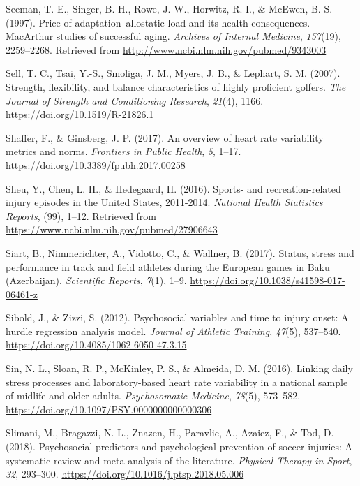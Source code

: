 \documentclass[man,floatsintext]{apa6}
\begin{document}
\leavevmode\hypertarget{ref-Seeman1997}{}%
Seeman, T. E., Singer, B. H., Rowe, J. W., Horwitz, R. I., \& McEwen, B. S. (1997). Price of adaptation--allostatic load and its health consequences. MacArthur studies of successful aging. \emph{Archives of Internal Medicine}, \emph{157}(19), 2259--2268. Retrieved from \url{http://www.ncbi.nlm.nih.gov/pubmed/9343003}

\leavevmode\hypertarget{ref-Sell2007}{}%
Sell, T. C., Tsai, Y.-S., Smoliga, J. M., Myers, J. B., \& Lephart, S. M. (2007). Strength, flexibility, and balance characteristics of highly proficient golfers. \emph{The Journal of Strength and Conditioning Research}, \emph{21}(4), 1166. \url{https://doi.org/10.1519/R-21826.1}

\leavevmode\hypertarget{ref-Shaffer2017}{}%
Shaffer, F., \& Ginsberg, J. P. (2017). An overview of heart rate variability metrics and norms. \emph{Frontiers in Public Health}, \emph{5}, 1--17. \url{https://doi.org/10.3389/fpubh.2017.00258}

\leavevmode\hypertarget{ref-Sheu2016}{}%
Sheu, Y., Chen, L. H., \& Hedegaard, H. (2016). Sports- and recreation-related injury episodes in the United States, 2011-2014. \emph{National Health Statistics Reports}, (99), 1--12. Retrieved from \url{https://www.ncbi.nlm.nih.gov/pubmed/27906643}

\leavevmode\hypertarget{ref-Siart2017}{}%
Siart, B., Nimmerichter, A., Vidotto, C., \& Wallner, B. (2017). Status, stress and performance in track and field athletes during the European games in Baku (Azerbaijan). \emph{Scientific Reports}, \emph{7}(1), 1--9. \url{https://doi.org/10.1038/s41598-017-06461-z}

\leavevmode\hypertarget{ref-Sibold2012}{}%
Sibold, J., \& Zizzi, S. (2012). Psychosocial variables and time to injury onset: A hurdle regression analysis model. \emph{Journal of Athletic Training}, \emph{47}(5), 537--540. \url{https://doi.org/10.4085/1062-6050-47.3.15}

\leavevmode\hypertarget{ref-Sin2016}{}%
Sin, N. L., Sloan, R. P., McKinley, P. S., \& Almeida, D. M. (2016). Linking daily stress processes and laboratory-based heart rate variability in a national sample of midlife and older adults. \emph{Psychosomatic Medicine}, \emph{78}(5), 573--582. \url{https://doi.org/10.1097/PSY.0000000000000306}

\leavevmode\hypertarget{ref-Slimani2018}{}%
Slimani, M., Bragazzi, N. L., Znazen, H., Paravlic, A., Azaiez, F., \& Tod, D. (2018). Psychosocial predictors and psychological prevention of soccer injuries: A systematic review and meta-analysis of the literature. \emph{Physical Therapy in Sport}, \emph{32}, 293--300. \url{https://doi.org/10.1016/j.ptsp.2018.05.006}
\end{document}
